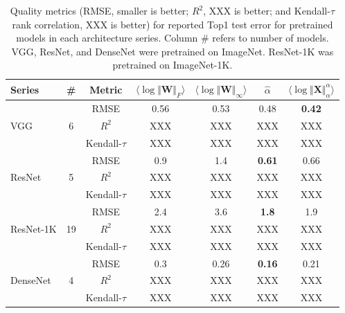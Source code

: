 \begin{table}[t]
\small
\begin{center}
\begin{tabular}{|p{1in}|c|c|c|c|c|c|}
\hline
 Series                      & \#                    & Metric         & $\langle\log\Vert\mathbf{W}\Vert_{F}\rangle$ & $\langle\log\Vert\mathbf{W}\Vert_{\infty}\rangle$ & $\hat{\alpha}$ & $\langle\log\Vert\mathbf{X}\Vert^{\alpha}_{\alpha}\rangle$ \\
\hline
\multirow{3}{4em}{VGG}       & \multirow{3}{1em}{6}  & RMSE           & 0.56 & 0.53 & 0.48          & \textbf{0.42}  \\
                             &                       & $R^2$          &  XXX &  XXX &  XXX          &  XXX           \\
                             &                       & Kendall-$\tau$ &  XXX &  XXX &  XXX          &  XXX           \\
\hline
\multirow{3}{4em}{ResNet}    & \multirow{3}{1em}{5}  & RMSE           &  0.9 & 1.4  & \textbf{0.61} & 0.66           \\
                             &                       & $R^2$          &  XXX &  XXX &  XXX          &  XXX           \\
                             &                       & Kendall-$\tau$ &  XXX &  XXX &  XXX          &  XXX           \\
\hline
\multirow{3}{4em}{ResNet-1K} & \multirow{3}{1em}{19} & RMSE           &  2.4 & 3.6  & \textbf{1.8}  & 1.9            \\
                             &                       & $R^2$          &  XXX &  XXX &  XXX          &  XXX           \\
                             &                       & Kendall-$\tau$ &  XXX &  XXX &  XXX          &  XXX           \\
\hline
\multirow{3}{4em}{DenseNet}  & \multirow{3}{1em}{4}  & RMSE           &  0.3 & 0.26 & \textbf{0.16} & 0.21           \\
                             &                       & $R^2$          &  XXX &  XXX &  XXX          &  XXX           \\
                             &                       & Kendall-$\tau$ &  XXX &  XXX &  XXX          &  XXX           \\
\hline
\end{tabular}
\end{center}
\caption{Quality metrics 
         (RMSE, smaller is better; $R^2$, XXX is better; and Kendall-$\tau$ rank correlation, XXX is better)
         for reported Top1 test error for pretrained models in each architecture series.  
         Column \# refers to number of models.  
         VGG, ResNet, and DenseNet were pretrained on ImageNet.  
         ResNet-1K was pretrained on ImageNet-1K. 
}
\label{table:cv-models}
\end{table}

